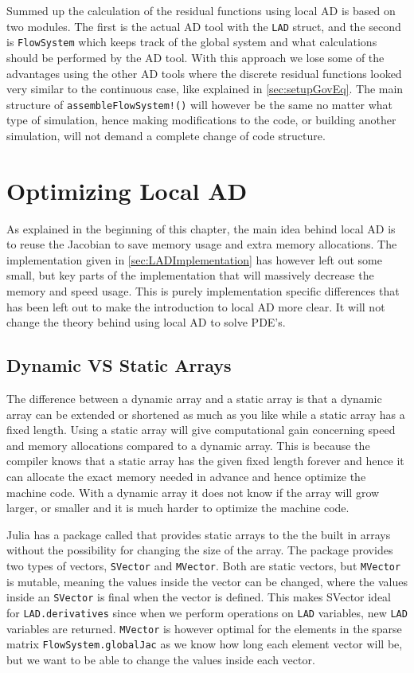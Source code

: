 Summed up the calculation of the residual functions using local AD is based on two modules. The first is the actual AD tool with the \texttt{LAD} struct, and the second is \texttt{FlowSystem} which keeps track of the global system and what calculations should be performed by the AD tool. With this approach we lose some of the advantages using the other AD tools where the discrete residual functions looked very similar to the continuous case, like explained in \autoref{sec:setupGovEq}. The main structure of \texttt{assembleFlowSystem!()} will however be the same no matter what type of simulation, hence making modifications to the code, or building another simulation, will not demand a complete change of code structure. 

\section{Optimizing Local AD}
\label{sec:optimizingLocalAD}
As explained in the beginning of this chapter, the main idea behind local AD is to reuse the Jacobian to save memory usage and extra memory allocations. The implementation given in \autoref{sec:LADImplementation} has however left out some small, but key parts of the implementation that will massively decrease the memory and speed usage. This is purely implementation specific differences that has been left out to make the introduction to local AD more clear. It will not change the theory behind using local AD to solve PDE's.

\subsection{Dynamic VS Static Arrays}
The difference between a dynamic array and a static array is that a dynamic array can be extended or shortened as much as you like while a static array has a fixed length. Using a static array will give computational gain concerning speed and memory allocations compared to a dynamic array. This is because the compiler knows that a static array has the given fixed length forever and hence it can allocate the exact memory needed in advance and hence optimize the machine code. With a dynamic array it does not know if the array will grow larger, or smaller and it is much harder to optimize the machine code. 

Julia has a package called \emph{\cite{StaticArrays}} that provides static arrays to the the built in arrays without the possibility for changing the size of the array. The package provides two types of vectors, \texttt{SVector} and \texttt{MVector}. Both are static vectors, but \texttt{MVector} is mutable, meaning the values inside the vector can be changed, where the values inside an \texttt{SVector} is final when the vector is defined. This makes SVector ideal for \texttt{LAD.derivatives} since when we perform operations on \texttt{LAD} variables, new \texttt{LAD} variables are returned. \texttt{MVector} is however optimal for the elements in the sparse matrix \texttt{FlowSystem.globalJac} as we know how long each element vector will be, but we want to be able to change the values inside each vector. 

